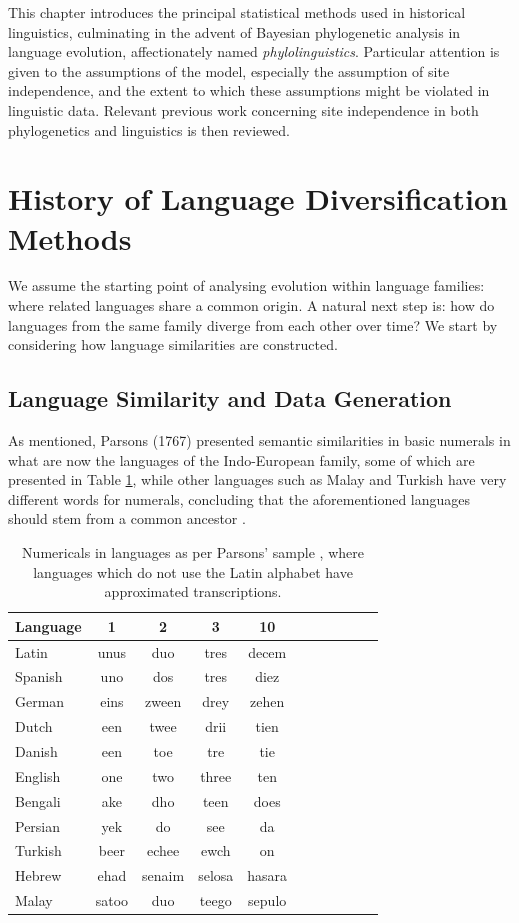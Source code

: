 This chapter introduces the principal statistical methods used in historical linguistics, culminating in the advent of Bayesian phylogenetic analysis in language evolution, affectionately named \textit{phylolinguistics}. Particular attention is given to the assumptions of the model, especially the assumption of site independence, and the extent to which these assumptions might be violated in linguistic data. Relevant previous work concerning site independence in both phylogenetics and linguistics is then reviewed.

\section{History of Language Diversification Methods}
We assume the starting point of analysing evolution within language families: where related languages share a common origin. A natural next step is: how do languages from the same family diverge from each other over time? We start by considering how language similarities are constructed.

\subsection{Language Similarity and Data Generation}
\label{sec:datageneration}
As mentioned, Parsons (1767) presented semantic similarities in basic numerals in what are now the languages of the Indo-European family, some of which are presented in Table \ref{tab:parsonssimilarities}, while other languages such as Malay and Turkish have very different words for numerals, concluding that the aforementioned languages should stem from a common ancestor \cite{Parsons1767}. 

\begin{table}[ht]
\centering
\begin{tabular}{lcccccccccc}
\hline
Language & 1 & 2 & 3 & 10 \\
\hline
Latin   & unus & duo & tres & decem \\
Spanish & uno & dos & tres & diez \\
German  & eins & zween & drey & zehen \\
Dutch   & een & twee & drii & tien \\
Danish  & een & toe & tre & tie \\
English & one & two & three & ten \\
Bengali & ake & dho & teen & does \\
Persian & yek & do & see & da \\
\hline
Turkish & beer & echee & ewch & on \\
Hebrew & ehad & senaim & selosa & hasara \\
Malay & satoo & duo & teego & sepulo \\
\hline
\end{tabular}
\caption{Numericals in languages as per Parsons' sample \cite{Parsons1767}, where languages which do not use the Latin alphabet have approximated transcriptions.}
\label{tab:parsonssimilarities}
\end{table}

